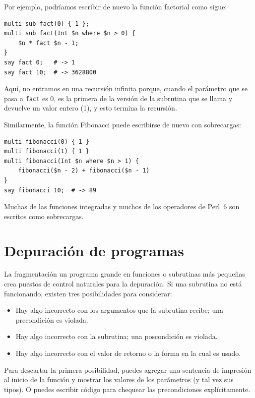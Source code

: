 Por ejemplo, podríamos escribir de nuevo la función factorial como
sigue:

\begin{lstlisting}
multi sub fact(0) { 1 };
multi sub fact(Int $n where $n > 0) {
    $n * fact $n - 1;
}
say fact 0;   # -> 1
say fact 10;  # -> 3628800
\end{lstlisting}

Aquí, no entramos en una recursión infinita porque, cuando
el parámetro que se pasa a {\tt fact} es 0, es la primera de la
versión de la subrutina que se llama y devuelve un valor entero (1),
y esto termina la recursión.

Similarmente, la función Fibonacci puede escribirse de nuevo
con sobrecargas:

\begin{lstlisting}
multi fibonacci(0) { 1 }
multi fibonacci(1) { 1 }
multi fibonacci(Int $n where $n > 1) { 
    fibonacci($n - 2) + fibonacci($n - 1) 
}
say fibonacci 10;  # -> 89
\end{lstlisting}

Muchas de las funciones integradas y muchos de los operadores de Perl~6 
son escritos como sobrecargas.

\section{Depuración de programas}
\label{factdebug}

La fragmentación un programa grande en funciones o subrutinas más
pequeñas crea puestos de control naturales para la depuración.
Si una subrutina no está funcionando, existen tres posibilidades
para considerar:

\begin{itemize}

\item Hay algo incorrecto con los argumentos que la subrutina
recibe; una precondición es violada.

\item Hay algo incorrecto con la subrutina; una poscondición
es violada.

\item Hay algo incorrecto con el valor de retorno o la forma
en la cual es usado.

\end{itemize}

Para descartar la primera posibilidad, puedes agregar una
sentencia de impresión al inicio de la función y mostrar los valores
de los parámetros (y tal vez sus tipos). O puedes escribir 
código para chequear las precondiciones explícitamente.

